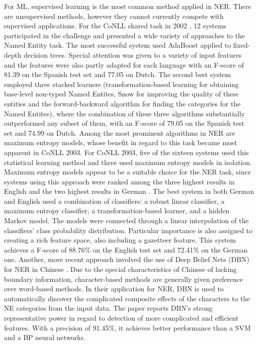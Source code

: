 \documentclass[11pt]{article}
\begin{document}
For ML, supervised learning is the most common method applied in NER.
There are unsupervised methods, however they cannot currently compete with supervised applications.
For the CoNLL shared task in 2002 \cite{tksintro}, 12 systems participated in the challenge and presented a wide variety of approaches to the Named Entity task.
The most successful system used AdaBoost applied to fixed-depth decision trees. Special attention was given to a variety of input features and the features were also
partly adapted for each language with an F-score of 81.39 on the Spanish test set and 77.05 on Dutch.
The second best system \cite{Florian:2002:NER:1118853.1118863} employed three stacked
learners (transformation-based learning for obtaining base-level non-typed Named Entites, Snow for improving the quality of these entities and the forward-backward algorithm for finding the categories for the Named Entites), where the combination of these three algorithms substantially outperformed any subset of them, with an F-score of 79.05 on the Spanish test set and 74.99 on Dutch.
Among the most prominent algorithms in NER are maximum entropy models, whose benefit in regard to this task became most apparent in CoNLL 2003. 
For CoNLL 2003, five of the sixteen systems used this statistical learning method and three used maximum entropy models in isolation.
Maximum entropy models appear to be a suitable choice for the NER task, since systems using this approach were ranked among the three highest results in 
English and the two highest results in German \cite{TjongKimSang:2003:ICS:1119176.1119195}.
The best system in both German and English \cite{Florian:2003:NER:1119176.1119201} used a combination of classifiers: a robust linear classifier, 
a maximum entropy classifier, a transformation-based learner, and a hidden Markov model. The models were connected through a linear interpolation of the classifiers’ %
class probability distribution. Particular importance is also assigned to creating a rich feature space, also including a gazetteer feature. 
This system achieves a F-score of 88.76\% on the English test set and 72.41\% on the German one.
Another, more recent approach involved the use of Deep Belief Nets (DBN) for NER in Chinese \cite{Chen:2010:UDB:1870457.1870473}.
Due to the special characteristics of Chinese of lacking boundary information, character-based methods are generally given preference over word-based methods.
In their application for NER, DBN  is used to automatically discover the complicated composite effects of the characters to the NE categories from the input data. 
The paper reports DBN's strong representative power in regard to detection of more complicated and efficient features. With a precision of 91.45\%,
it achieves better performance than a SVM and a BP neural networks.
\end{document}
